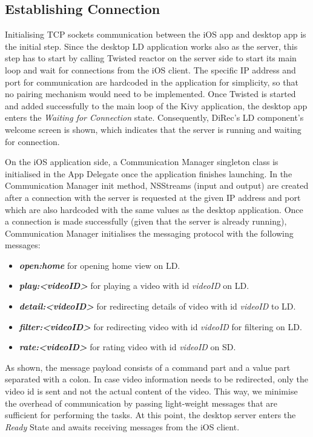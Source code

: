 \subsection{Establishing Connection}
Initialising TCP sockets communication between the iOS app and desktop app is
the initial step. Since the desktop LD application works also as the server,
this step has to start by calling Twisted reactor on the server side to start its main loop and
wait for connections from the iOS client. The specific IP address and port for
communication are hardcoded in the application for simplicity, so that no
pairing mechanism would need to be implemented. Once Twisted is started and
added successfully to the main loop of the Kivy application, the desktop app
enters the \textit{Waiting for Connection} state. Consequently, DiRec's LD
component's welcome screen is shown, which indicates that the server is running and
waiting for connection.\par
On the iOS application side, a Communication Manager singleton class is
initialised in the App Delegate once the application finishes launching. In the Communication Manager init method, NSStreams (input and output) are created after a connection with the server is requested at the given IP address and port which are also hardcoded with the same values as the desktop application. Once a connection is made successfully (given that the server is already running), Communication Manager initialises the messaging protocol with the following messages:
\begin{itemize}
	\item \textbf{\textit{open:home}} for opening home view on LD. 
	\item \textbf{\textit{play:<videoID>}} for playing a video with id \textit{videoID} on LD.
	\item \textbf{\textit{detail:<videoID>}} for redirecting details of video with id \textit{videoID} to LD.
	\item \textbf{\textit{filter:<videoID>}} for redirecting video with id \textit{videoID} for filtering on LD.
	\item \textbf{\textit{rate:<videoID>}} for rating video with id \textit{videoID} on SD.
\end{itemize}

As shown, the message payload consists of a command part and a value part
separated with a colon. In case video information needs to be redirected, only
the video id is sent and not the actual content of the video. This way, we
minimise the overhead of communication by passing light-weight messages that are
sufficient for performing the tasks. At this point, the desktop server enters
the \textit{Ready} State and awaits receiving messages from the iOS client.

